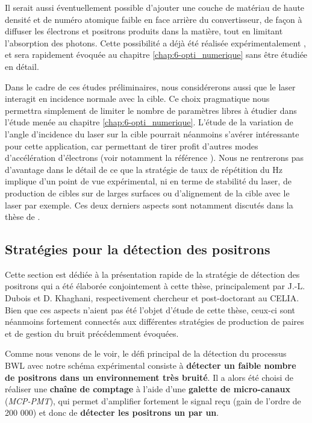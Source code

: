\begin{refsection}
Il serait aussi éventuellement possible d'ajouter une couche de matériau de haute densité et de numéro atomique faible en face arrière du convertisseur, de façon à diffuser les électrons et positrons produits dans la matière, tout en limitant l'absorption des photons. Cette possibilité a déjà été réalisée expérimentalement \parencite{glinec_2005}, et sera rapidement évoquée au chapitre \ref{chap:6-opti_numerique} sans être étudiée en détail.

Dans le cadre de ces études préliminaires, nous considérerons aussi que le laser interagit en incidence normale avec la cible. Ce choix pragmatique nous permettra simplement de limiter le nombre de paramètres libres à étudier dans l'étude menée au chapitre \ref{chap:6-opti_numerique}. L'étude de la variation de l'angle d'incidence du laser sur la cible pourrait néanmoins s'avérer intéressante pour cette application, car permettant de tirer profit d'autres modes d'accélération d'électrons (voir notamment la référence \parencite{chopineau_2019}). Nous ne rentrerons pas d'avantage dans le détail de ce que la stratégie de taux de répétition du Hz implique d'un point de vue expérimental, ni en terme de stabilité du laser, de production de cibles sur de larges surfaces ou d'alignement de la cible avec le laser par exemple. Ces deux derniers aspects sont notamment discutés dans la thèse de \cite{carrier-vallieres_2017}.

\subsection{Stratégies pour la détection des positrons}

Cette section est dédiée à la présentation rapide de la stratégie de détection des positrons qui a été élaborée conjointement à cette thèse, principalement par J.-L. Dubois et D. Khaghani, respectivement chercheur et post-doctorant au CELIA. Bien que ces aspects n'aient pas été l'objet d'étude de cette thèse, ceux-ci sont néanmoins fortement connectés aux différentes stratégies de production de paires et de gestion du bruit précédemment évoquées.

Comme nous venons de le voir, le défi principal de la détection du processus BWL avec notre schéma expérimental consiste à \textbf{détecter un faible nombre de positrons dans un environnement très bruité}. Il a alors été choisi de réaliser une \textbf{chaîne de comptage} à l'aide d'une \textbf{galette de micro-canaux} (\textit{MCP-PMT}), qui permet d'amplifier fortement le signal reçu (gain de l'ordre de 200 000) et donc de \textbf{détecter les positrons un par un}. 


\end{refsection}
